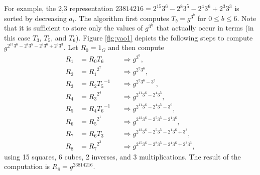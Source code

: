 \documentclass{ucalgthes1}
\theoremstyle{definition}
\begin{document}
For example, the 2,3 representation $23814216 = 2^{15} 3^6 - 2^8 3^5 - 2^4 3^6 + 2^3 3^3$ is sorted by decreasing $a_i$.  The algorithm first computes $T_b = g^{3^b}$ for $0 \le b \le 6$.  Note that it is sufficient to store only the values of $g^{3^{b_i}}$ that actually occur in terms (in this case $T_3$, $T_5$, and $T_6$).  Figure \ref{fig:yao1} depicts the following steps to compute $g^{2^{15} 3^6 - 2^8 3^5 - 2^4 3^6 + 2^3 3^3}$.  Let $R_0 = 1_G$ and then compute
\begin{align*}
	R_1 &= R_0 T_6  && \Rightarrow g^{3^6}, \\
	R_2 &= {R_1}^{2^7} && \Rightarrow g^{2^7 3^6}, \\
	R_3 &= R_2 {T_5}^{-1} && \Rightarrow g^{2^7 3^6 -3^5}, \\		
	R_4 &= {R_3}^{2^4} && \Rightarrow g^{2^{11} 3^6 -2^4 3^5}, \\
	R_5 &= R_4 {T_6}^{-1} && \Rightarrow g^{2^{11} 3^6 -2^4 3^5 -3^6}, \\
	R_6 &= {R_5}^{2^1} && \Rightarrow g^{2^{12} 3^6 -2^5 3^5 -2^1 3^6}, \\
	R_7 &= R_6 T_3 && \Rightarrow g^{2^{12} 3^6 -2^5 3^5 -2^1 3^6 +3^3}, \\
	R_8 &= {R_7}^{2^3} && \Rightarrow g^{2^{15} 3^6 -2^8 3^5 -2^4 3^6 +2^3 3^3},
\end{align*}
using 15 squares, 6 cubes, 2 inverses, and 3 multiplications.  The result of the computation is $R_8 = g^{23814216}$.
\end{document}
